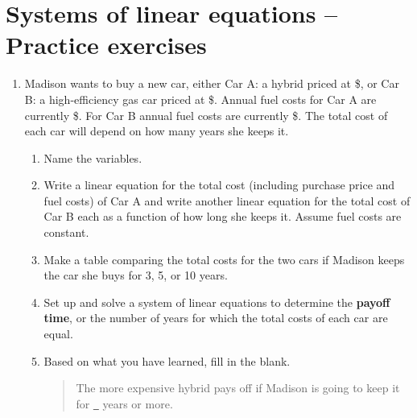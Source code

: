 
\section{Systems of linear equations -- Practice exercises}

\begin{enumerate}
\item Madison wants to buy a new car, either Car A:  a hybrid priced at \$, or Car B: a high-efficiency gas car priced at \$.  Annual fuel costs for Car A are currently \$.  For Car B annual fuel costs are currently \$.  The total cost of each car will depend on how many years she keeps it. 
\begin{enumerate}
\item Name the variables. \vfill
\item Write a linear equation for the total cost (including purchase price and fuel costs) of Car A and write another linear equation for the total cost of Car B each as a function of how long she keeps it.  Assume fuel costs are constant. \vfill
\item Make a table comparing the total costs for the two cars if Madison keeps the car she buys for 3, 5, or 10 years. \vfill
\item Set up and solve a system of linear equations to determine the \textbf{payoff time}, or the number of years for which the total costs of each car are equal. \vfill \vfill
\item Based on what you have learned, fill in the blank.
\begin{quote}
The more expensive hybrid pays off if Madison is going to keep it for \underline{\quad~} years or more.  
\end{quote}
\end{enumerate}

\newpage %


\end{enumerate}

